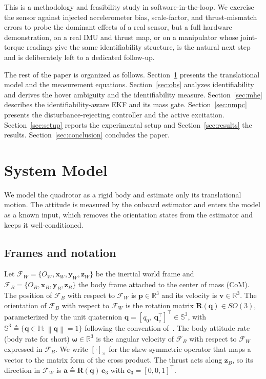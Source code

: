 \documentclass{ieeeaccess}
\newcommand{\R}{\mathbb{R}}
\newcommand{\SOg}{SO(3)}
\newcommand{\norm}[1]{\left\| #1 \right\|}
\newcommand{\vect}[1]{\bm{#1}}
\newcommand{\mat}[1]{\mathbf{#1}}
\begin{document}
This is a methodology and feasibility study in software-in-the-loop. We exercise
the sensor against injected accelerometer bias, scale-factor, and thrust-mismatch
errors to probe the dominant effects of a real sensor, but a full hardware demonstration,
on a real IMU and thrust map, or on a manipulator whose joint-torque readings give
the same identifiability structure, is the natural next step and is deliberately left
to a dedicated follow-up.

The rest of the paper is organized as follows. Section~\ref{sec:model}
presents the translational model and the measurement equations.
Section~\ref{sec:obs} analyzes identifiability and derives the hover ambiguity and
the identifiability measure. Section~\ref{sec:mhe} describes the
identifiability-aware EKF and its mass gate. Section~\ref{sec:nmpc} presents the
disturbance-rejecting controller and the active excitation.
Section~\ref{sec:setup} reports the experimental setup and
Section~\ref{sec:results} the results. Section~\ref{sec:conclusion} concludes the paper.

\section{System Model}\label{sec:model}

We model the quadrotor as a rigid body and estimate only its translational
motion. The attitude is measured by the onboard estimator and enters the model
as a known input, which removes the orientation states from the estimator and
keeps it well-conditioned.

\subsection{Frames and notation}
Let $\mathcal{F}_W=\{O_W,\vect{x}_W,\vect{y}_W,\vect{z}_W\}$ be the inertial
world frame and $\mathcal{F}_B=\{O_B,\vect{x}_B,\vect{y}_B,\vect{z}_B\}$ the body
frame attached to the center of mass (CoM). The position of $\mathcal{F}_B$ with
respect to $\mathcal{F}_W$ is $\vect{p}\in\R^3$ and its velocity is
$\vect{v}\in\R^3$. The orientation of $\mathcal{F}_B$ with respect to
$\mathcal{F}_W$ is the rotation matrix $\mat{R}(\vect{q})\in\SOg$, parameterized
by the unit quaternion
$\vect{q}=[q_0,\ \vect{q}_v^{\!\top}]^{\!\top}\in\mathbb{S}^3$, with
$\mathbb{S}^3\triangleq\{\vect{q}\in\mathbb{H}:\norm{\vect{q}}=1\}$ following the
convention of~\cite{shuster1993survey}. The body attitude rate (body rate for short) $\vect{\omega}\in\R^3$ is
the angular velocity of $\mathcal{F}_B$ with respect to $\mathcal{F}_W$ expressed
in $\mathcal{F}_B$. We write $[\cdot]_\times$ for the skew-symmetric operator
that maps a vector to the matrix form of the cross product. The thrust acts
along $\vect{z}_B$, so its direction in $\mathcal{F}_W$ is
$\vect{a}\triangleq\mat{R}(\vect{q})\,\vect{e}_3$ with
$\vect{e}_3=[0,0,1]^{\!\top}$.
\end{document}
